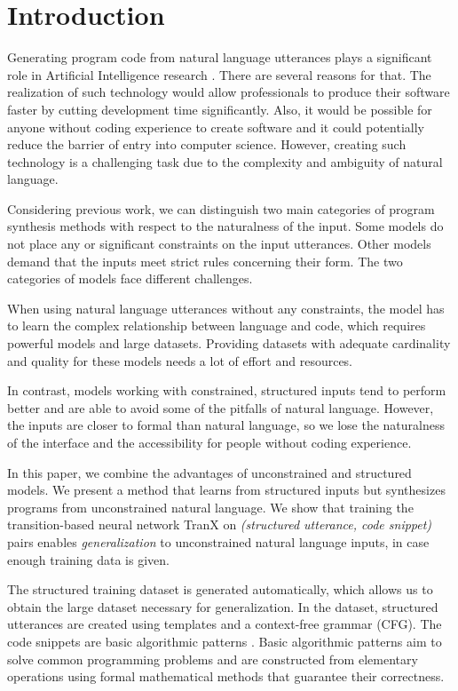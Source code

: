 \section{Introduction}
%
Generating program code from natural language utterances plays a significant
role in Artificial Intelligence research \cite{useful1, useful2, useful3}. There are several reasons for that. The realization of such technology would allow professionals to produce their
software faster by cutting development time significantly. Also, it would be
possible for anyone without coding experience to create software and it could
potentially reduce the barrier of entry into computer science. However, creating
such technology is a challenging task due to the complexity and ambiguity of
natural language. 

Considering previous work, we can distinguish two main categories of program
synthesis methods with respect to the naturalness of the input. Some models do
not place any or significant constraints on the input utterances. Other models
demand that the inputs meet strict rules concerning their form. The two
categories of models face different challenges.

When using natural language utterances without any constraints\cite{text1,
  text2}, the model has to learn the complex relationship between language and
code, which requires powerful models and large datasets. Providing datasets with
adequate cardinality and quality for these models needs a lot of effort and
resources.

In contrast, models working with constrained, structured inputs tend to perform
better and are able to avoid some of the pitfalls of natural language. However,
the inputs are closer to formal than natural language, so we lose the
naturalness of the interface and the accessibility for people without coding
experience.

In this paper, we combine the advantages of unconstrained and structured models.
We present a method that learns from structured inputs but synthesizes programs
from unconstrained natural language. We show that training the transition-based
\cite{trans} neural network TranX \cite{tranx} on \emph{(structured utterance, code
snippet)} pairs enables \emph{generalization} to unconstrained natural language
inputs, in case enough training data is given.

The structured training dataset is generated automatically, which allows us to obtain the large dataset necessary for generalization. In the dataset, structured utterances are created using templates and a context-free grammar (CFG). The code snippets are basic algorithmic patterns \cite{progT}. Basic algorithmic patterns aim to solve common programming problems and are constructed from elementary operations using formal mathematical methods that guarantee their correctness. 

